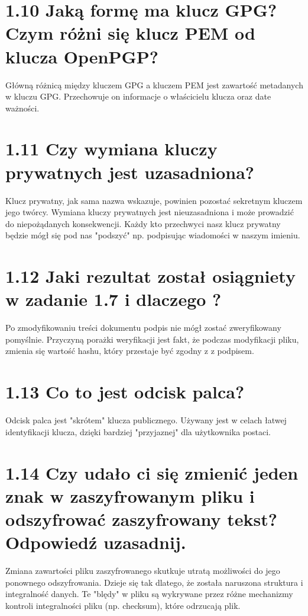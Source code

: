 \documentclass{article}
\begin{document}
\section*{1.10 Jaką formę ma klucz GPG? Czym różni się klucz PEM od klucza OpenPGP?}

Główną różnicą między kluczem GPG a kluczem PEM jest zawartość metadanych w kluczu GPG.
Przechowuje on informacje o właścicielu klucza oraz date ważności.


\section*{1.11 Czy wymiana kluczy prywatnych jest uzasadniona?}

Klucz prywatny, jak sama nazwa wskazuje, powinien pozostać sekretnym kluczem jego twórcy. Wymiana kluczy prywatnych jest nieuzasadniona i może prowadzić do
niepożądanych konsekwencji. Każdy kto przechwyci nasz klucz prywatny będzie mógł się pod nas "podszyć" np. podpisując wiadomości w naszym imieniu.

\section*{1.12 Jaki rezultat został osiągniety w zadanie 1.7 i dlaczego ?}

Po zmodyfikowaniu treści dokumentu podpis nie mógł zostać zweryfikowany pomyślnie.
Przyczyną porażki weryfikacji jest fakt, że podczas modyfikacji pliku, zmienia się wartość hashu, który przestaje być zgodny z z podpisem.

\section*{1.13 Co to jest odcisk palca?}

Odcisk palca jest "skrótem" klucza publicznego. Używany jest w celach łatwej identyfikacji klucza, dzięki bardziej "przyjaznej" dla użytkownika postaci.

\section*{1.14 Czy udało ci się zmienić jeden znak w zaszyfrowanym pliku i odszyfrować zaszyfrowany
  tekst? Odpowiedź uzasadnij.}

Zmiana zawartości pliku zaszyfrowanego skutkuje utratą możliwości do jego ponownego odszyfrowania.
Dzieje się tak dlatego, że została naruszona struktura i integralność danych. Te "blędy" w pliku są wykrywane przez różne mechanizmy
kontroli integralności pliku (np. checksum), które odrzucają plik.
\end{document}
